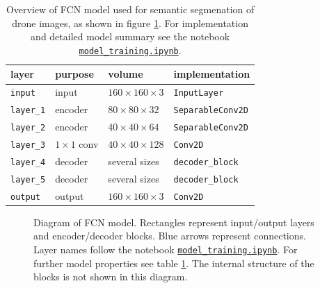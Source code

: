 \documentclass[11pt, onecolumn, oneside, reqno]{article}
\begin{document}
{\renewcommand{\arraystretch}{2}%
\begin{table}
\centering
\begin{tabular}{|l|l|l|l|}
\hline 
layer             & purpose           & volume                    & implementation          \\
\hline
\texttt{input}    & input             & $160 \times 160 \times 3$ & \texttt{InputLayer}     \\
\texttt{layer\_1} & encoder           & $80 \times 80 \times 32$  & \texttt{SeparableConv2D}\\
\texttt{layer\_2} & encoder           & $40 \times 40 \times 64$  & \texttt{SeparableConv2D}\\
\texttt{layer\_3} & $1 \times 1$ conv & $40 \times 40 \times 128$ & \texttt{Conv2D}         \\
\texttt{layer\_4} & decoder           & several sizes             & \texttt{decoder\_block}  \\
\texttt{layer\_5} & decoder           & several sizes             & \texttt{decoder\_block}  \\
\texttt{output}   & output            & $160 \times 160 \times 3$ & \texttt{Conv2D}         \\
\hline
\end{tabular}%
\caption[FCN model properties]{Overview of FCN model used for semantic segmenation of drone images, as shown in figure \ref{img:reference_architecture}. For implementation and detailed model summary see the notebook \href{https://github.com/S2H-Mobile/RoboND-DeepLearning-Project-Solution/blob/master/code/model_training.ipynb}{\texttt{model\_training.ipynb}}.}
\label{tbl:fcn_architecture}
\end{table}

\begin{figure}
\noindent
{}
\caption[Diagram of FCN model]{Diagram of FCN model. Rectangles represent input/output layers and encoder/decoder blocks. Blue arrows represent connections. Layer names follow the notebook \href{https://github.com/S2H-Mobile/RoboND-DeepLearning-Project-Solution/blob/master/code/model_training.ipynb}{\texttt{model\_training.ipynb}}. For further model properties see table \ref{tbl:fcn_architecture}. The internal structure of the blocks is not shown in this diagram.}
\label{img:reference_architecture}
\end{figure}

}
\end{document}
